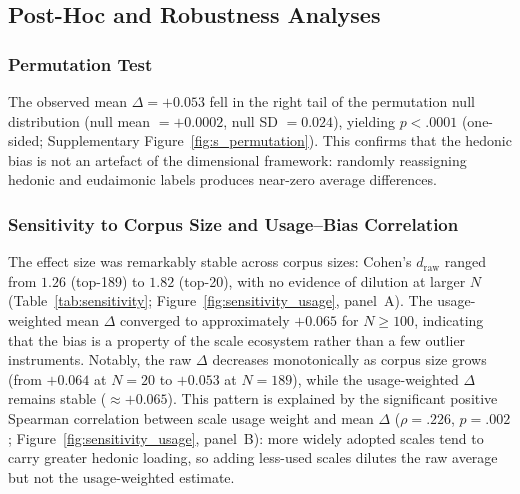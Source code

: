 \documentclass[12pt,a4paper]{article}
\begin{document}
\subsection{Post-Hoc and Robustness Analyses}\label{sec:results-posthoc}

\subsubsection{Permutation Test}

The observed mean $\Delta = +0.053$ fell in the right tail of the permutation null distribution (null mean $= +0.0002$, null SD $= 0.024$), yielding $p < .0001$ (one-sided; Supplementary Figure~\ref{fig:s_permutation}).
This confirms that the hedonic bias is not an artefact of the dimensional framework: randomly reassigning hedonic and eudaimonic labels produces near-zero average differences.

\subsubsection{Sensitivity to Corpus Size and Usage--Bias Correlation}

The effect size was remarkably stable across corpus sizes: Cohen's $d_{\text{raw}}$ ranged from $1.26$ (top-189) to $1.82$ (top-20), with no evidence of dilution at larger $N$ (Table~\ref{tab:sensitivity}; Figure~\ref{fig:sensitivity_usage}, panel~A).
The usage-weighted mean $\Delta$ converged to approximately $+0.065$ for $N \geq 100$, indicating that the bias is a property of the scale ecosystem rather than a few outlier instruments.
Notably, the raw $\Delta$ decreases monotonically as corpus size grows (from $+0.064$ at $N=20$ to $+0.053$ at $N=189$), while the usage-weighted $\Delta$ remains stable ($\approx +0.065$).
This pattern is explained by the significant positive Spearman correlation between scale usage weight and mean $\Delta$ ($\rho = .226$, $p = .002$; Figure~\ref{fig:sensitivity_usage}, panel~B): more widely adopted scales tend to carry greater hedonic loading, so adding less-used scales dilutes the raw average but not the usage-weighted estimate.
\end{document}
